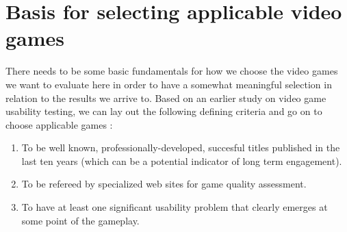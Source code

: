 \section{Basis for selecting applicable video games}
There needs to be some basic fundamentals for how we choose the video games we want to evaluate here in order to have a somewhat meaningful selection in relation to the results we arrive to. Based on an earlier study on video game usability testing, we can lay out the following defining criteria and go on to choose applicable games \cite{Febretti2009a}:
\begin{enumerate}
	\item To be well known, professionally-developed, succesful titles published in the last ten years (which can be a potential indicator of long term engagement).
	\item To be refereed by specialized web sites for game quality assessment.
	\item To have at least one significant usability problem that clearly emerges at some point of the gameplay.
\end{enumerate}
